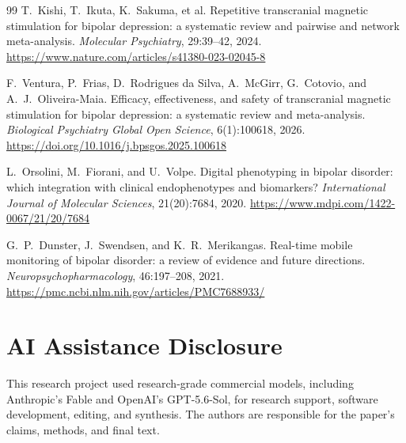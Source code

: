 \documentclass[11pt]{article}
\theoremstyle{remark}
\theoremstyle{plain}
\begin{document}
\begin{thebibliography}{99}
T.\ Kishi, T.\ Ikuta, K.\ Sakuma, et al.
\newblock Repetitive transcranial magnetic stimulation for bipolar depression: a systematic review and pairwise and network meta-analysis.
\newblock \emph{Molecular Psychiatry}, 29:39--42, 2024.
\newblock \url{https://www.nature.com/articles/s41380-023-02045-8}

F.\ Ventura, P.\ Frias, D.\ Rodrigues da Silva, A.\ McGirr, G.\ Cotovio, and A.\ J.\ Oliveira-Maia.
\newblock Efficacy, effectiveness, and safety of transcranial magnetic stimulation for bipolar depression: a systematic review and meta-analysis.
\newblock \emph{Biological Psychiatry Global Open Science}, 6(1):100618, 2026.
\newblock \url{https://doi.org/10.1016/j.bpsgos.2025.100618}

L.\ Orsolini, M.\ Fiorani, and U.\ Volpe.
\newblock Digital phenotyping in bipolar disorder: which integration with clinical endophenotypes and biomarkers?
\newblock \emph{International Journal of Molecular Sciences}, 21(20):7684, 2020.
\newblock \url{https://www.mdpi.com/1422-0067/21/20/7684}

G.\ P.\ Dunster, J.\ Swendsen, and K.\ R.\ Merikangas.
\newblock Real-time mobile monitoring of bipolar disorder: a review of evidence and future directions.
\newblock \emph{Neuropsychopharmacology}, 46:197--208, 2021.
\newblock \url{https://pmc.ncbi.nlm.nih.gov/articles/PMC7688933/}

\end{thebibliography}

\section*{AI Assistance Disclosure}
This research project used research-grade commercial models, including
Anthropic's Fable and OpenAI's GPT-5.6-Sol, for research support, software
development, editing, and synthesis. The authors are responsible for the
paper's claims, methods, and final text.
\end{document}
